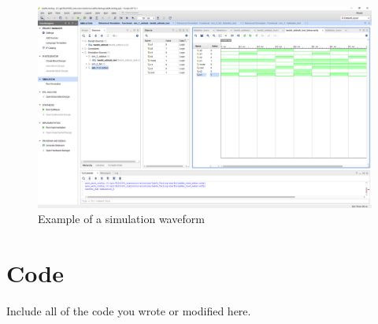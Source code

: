 \documentclass[11pt]{article}
\begin{document}
\begin{figure}[ht]\centering
	\includegraphics[width=1\textwidth,trim=18cm 15.5cm .5cm 4.5cm,clip]{lab1_example_screenshot} \caption{Example of a simulation waveform} 
	
	\label{fig:example_sim}
	
\end{figure}	

\section*{Code}

Include all of the code you wrote or modified here.
\end{document}
